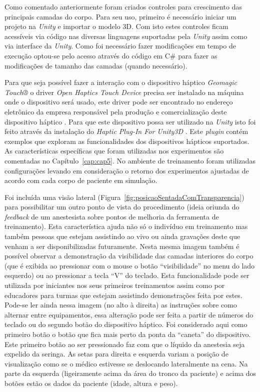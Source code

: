 Como comentado anteriormente foram criados controles para crescimento das principais camadas do corpo. Para seu uso, primeiro é necessário iniciar um projeto na \textit{Unity} e importar o modelo 3D. Com isto estes controles ficam acessíveis via código nas diversas linguagens suportadas pela \textit{Unity} assim como via interface da \textit{Unity}. Como foi necessário fazer modificações em tempo de execução optou-se pelo acesso através do código em C\# para fazer as modificações de tamanho das camadas (quando necessário). 

Para que seja possível fazer a interação com o dispositivo háptico \textit{Geomagic Touch®} o driver \textit{Open Haptics Touch Device} precisa ser instalado na máquina onde o dispositivo será usado, este driver pode ser encontrado no endereço eletrônico da empresa responsável pela produção e comercialização deste dispositivo háptico \cite{3DSystemsTouch2018}. Para que este dispositivo possa ser utilizado na \textit{Unity} isto foi feito através da instalação do \textit{Haptic Plug-In For Unity3D} \cite{Poyade2014}. Este \textit{plugin} contém exemplos que exploram as funcionalidades dos dispositivos hápticos suportados. As características específicas que foram utilizadas nos experimentos são comentadas no Capítulo~\ref{cap:cap5}. No ambiente de treinamento foram utilizadas configurações levando em consideração o retorno dos experimentos ajustadas de acordo com cada corpo de paciente em simulação. 

Foi incluída uma visão lateral (Figura~\ref{fig:posicaoSentadaComTransparencia}) para possibilitar um outro ponto de vista do procedimento (ideia oriunda do \textit{feedback} de um anestesista sobre pontos de melhoria da ferramenta de treinamento). Esta característica ajuda não só o indivíduo em treinamento mas também pessoas que estejam assistindo ao vivo ou ainda gravações deste que venham a ser disponibilizadas futuramente. Nesta mesma imagem também é possível observar a demonstração da visibilidade das camadas interiores do corpo (que é exibida ao pressionar com o mouse o botão ``visibilidade'' no menu do lado esquerdo) ou ao pressionar a tecla ``V'' do teclado. Esta funcionalidade pode ser utilizada por iniciantes nos seus primeiros treinamentos assim como por educadores para turmas que estejam assistindo demonstrações feita por estes. Pode-se ler ainda nessa imagem (no alto à direita) as instruções sobre como alternar entre equipamentos, essa alteração pode ser feita a partir de números do teclado ou do segundo botão do dispositivo háptico. Foi considerado aqui como primeiro botão o botão que fica mais perto da ponta da ``caneta'' do dispositivo. Este primeiro botão ao ser pressionado faz com que o líquido da anestesia seja expelido da seringa. As setas para direita e esquerda variam a posição de visualização como se o médico estivesse se deslocando lateralmente na cena. Na parte da esquerda (ligeiramente acima da área do tronco da paciente) e acima dos botões estão os dados da paciente (idade, altura e peso). 

